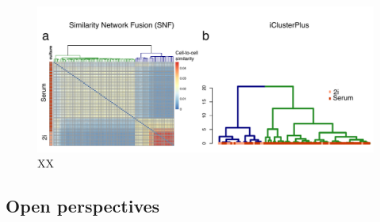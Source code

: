 \begin{figure}[H]
	\centering 	
	\includegraphics[width=1.0\textwidth]{MOFA_scMT_clustering}
	\caption{XX}
	\label{fig:MOFA_scMT_clustering}
\end{figure}


\subsection{Open perspectives}

